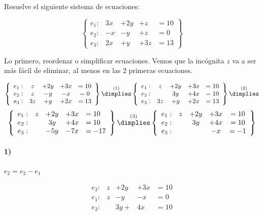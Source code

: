 \documentclass[palatino,nosec,nochap]{Docencia}
\begin{document}
\newpage
\begin{problem}
Resuelve el siguiente sistema de ecuaciones:

\[
\left\{\begin{array}{lllll}
e_1: & 3x &+ 2y &+z &=10\\
e_2: & -x&-y&+z&=0\\
e_3: & 2x&+y&+3z&=13
\end{array}\right\}
\]

\solution

Lo primero, reordenar o simplificar ecuaciones. Vemos que la incógnita $z$ va a ser más fácil de eliminar, al menos en las 2 primeras ecuaciones. 

\[
\left\{\begin{array}{lcccc}
e_1: & z &+ 2y &+3x &=10\\
e_2: & z&-y&-x&=0\\
e_3: & 3z&+y&+2x&=13
\end{array}\right\} 
\overset{(1)}{\dimplies}
\left\{\begin{array}{lccccc}
e_1: & z &+ 2y &+3x &=10\\
e_2: & &3y&+4x&=10\\
e_3: &3z&+y&+2x&=13
\end{array}\right\}
\overset{(2)}{\dimplies}\]
\[
\left\{\begin{array}{lcccl}
e_1: & z&+ 2y&+3x &=10\\
e_2: & &3y&+4x&=10\\
e_3: & &-5y&-7x&=-17\\
\end{array}\right\}
\overset{(3)}{\dimplies}
\left\{\begin{array}{lccccc}
e_1: & z&+ 2y&+3x &=10\\
e_2: & &3y&+4x&=10\\
e_3: &&&-x&=-1\\
\end{array}\right\}
\]


\paragraph{1)}
$e_2 = e_2-e_1$

\[
\begin{array}{rcccl}
e_2: & z &+ 2y &+3x &=10\\
e_1: & z&-y&-x&=0\\
\hline
e_2: & &3y+&4x&=10\\
\end{array}
\]	


\end{problem}
\end{document}
